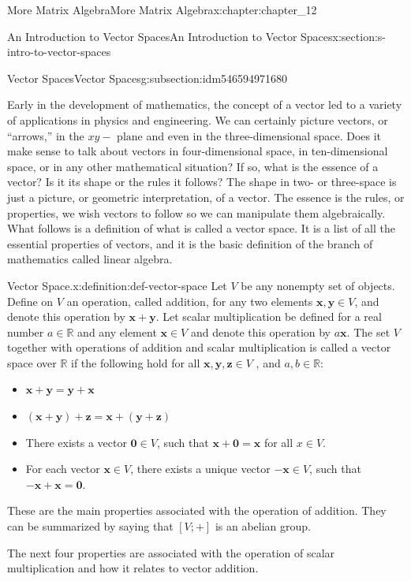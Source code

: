 \documentclass[oneside,10pt,]{book}
\numberwithin{equation}{section}
\renewcommand{\vec}[1]{\mathbf{#1}}
\begin{document}
\begin{chapterptx}{More Matrix Algebra}{}{More Matrix Algebra}{}{}{x:chapter:chapter_12}
\begin{sectionptx}{An Introduction to Vector Spaces}{}{An Introduction to Vector Spaces}{}{}{x:section:s-intro-to-vector-spaces}
\begin{subsectionptx}{Vector Spaces}{}{Vector Spaces}{}{}{g:subsection:idm546594971680}
\par
Early in the development of mathematics, the concept of a vector led to a variety of applications in physics and engineering. We can certainly picture vectors, or ``arrows,'' in the \(x y-\textrm{ plane}\) and even in the three-dimensional space. Does it make sense to talk about vectors in four-dimensional space, in ten-dimensional space, or in any other mathematical situation? If so, what is the essence of a vector? Is it its shape or  the rules it follows? The shape in two- or three-space is just a picture, or geometric interpretation, of a vector. The essence is the rules, or properties, we wish vectors to follow so we can manipulate them algebraically. What follows is a definition of what is called a vector space. It is a list of all the essential properties of vectors, and it is the basic definition of the branch of mathematics  called linear algebra.%
\begin{definition}{Vector Space.}{x:definition:def-vector-space}%
%
Let \(V\) be any nonempty set of objects. Define on \(V\) an operation, called addition, for any two elements \(\vec{x}, \vec{y} \in  V\), and denote this operation by \(\vec{x}+ \vec{y}\). Let scalar multiplication be defined for a real number \(a \in \mathbb{R}\) and any element \(\vec{x}\in V\) and denote this operation by \(a \vec{x}\). The set \(V\) together with operations of addition and scalar multiplication is called a vector space over \(\mathbb{R}\) if the following hold for all \(\vec{x}, \vec{y}, \vec{z}\in
V\) , and \(a,b \in \mathbb{R}\):%
\begin{itemize}[label=\textbullet]
\item{}\(\vec{x}+ \vec{y}= \vec{y}+ \vec{x}\)%
\item{}\(\left(\vec{x}+ \vec{y}\right)+ \vec{z}= \vec{x}+\left(
\vec{y}+\vec{z}\right)\)%
\item{}There exists a vector  \(\vec{0}\in V\), such that \(\vec{x}+\vec{0} =
\vec{x}\) for all \(x \in V\).%
\item{}For each vector  \(\vec{x}\in V\), there exists a unique vector \(-\vec{x}\in V\), such that \(-\vec{x} +\vec{x}= \vec{0}\).%
\end{itemize}
These are the main properties associated with the operation of addition. They can be summarized by saying that \([V; +]\) is an abelian group.%
\par
The next four properties are associated with the operation of scalar multiplication and how it relates to vector addition.%
\begin{itemize}[label=\textbullet]

\end{itemize}
\end{definition}
\end{subsectionptx}
\end{sectionptx}
\end{chapterptx}
\end{document}
